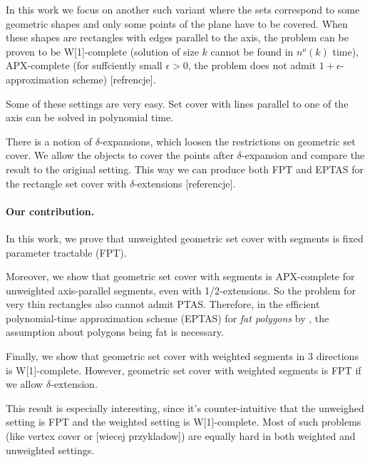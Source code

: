 In this work we focus on another such variant where the sets correspond
to some geometric shapes and
only some points of the plane have to be covered.
When these shapes are rectangles with edges parallel
to the axis, the problem can be proven to
be W[1]-complete (solution of size $k$ cannot be found
in $n^o(k)$ time),
APX-complete (for suffciently small $\epsilon > 0$, the problem
does not admit $1+\epsilon$-approximation scheme)
[refrencje].

Some of these settings are very easy.
Set cover with lines parallel to one of the axis
can be solved in polynomial time.

There is a notion of $\delta$-expansions,
which loosen the restrictions on geometric set cover.
We allow the objects to cover the points
after $\delta$-expansion and compare
the result to the original setting.
This way we can produce both FPT and EPTAS
for the rectangle set cover with $\delta$-extensions
[referencje].



\paragraph{Our contribution.}
In this work, we prove that unweighted geometric set cover
with segments is fixed parameter tractable (FPT).

Moreover, we show that geometric set cover with segments
is APX-complete for unweighted axis-parallel segments,
even with 1/2-extensions.
So the problem for very thin rectangles
also cannot admit PTAS.
Therefore, in the efficient polynomial-time approximation scheme (EPTAS)
for \textit{fat polygons} by \cite{harpeled12},
the assumption about polygons being fat is necessary. 

Finally, we show that geometric set cover with weighted segments in
3 directions is W[1]-complete.
However, geometric set cover with weighted segments is FPT if we allow
$\delta$-extension.

This result is especially interesting,
since it's counter-intuitive that
the unweighed setting is FPT and the weighted
setting is W[1]-complete.
Most of such problems (like vertex cover or [wiecej przykladow])
are equally hard in both weighted and unweighted settings.

\fi

